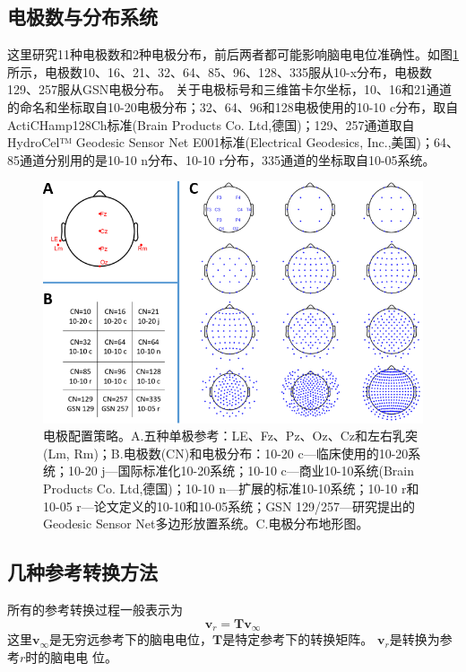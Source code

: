\subsection{电极数与分布系统}
这里研究11种电极数和2种电极分布，前后两者都可能影响脑电电位准确性。如图\ref{2:layout}所示，电极数10、16、21、32、64、85、96、128、335服从10-x分布，电极数129、257服从GSN电极分布。
关于电极标号和三维笛卡尔坐标，10、16和21通道的命名和坐标取自10-20电极分布；32、64、96和128电极使用的10-10 c分布，取自ActiCHamp128Ch标准(Brain Products Co. Ltd,德国)；129、257通道取自HydroCel™ Geodesic Sensor Net E001标准(Electrical Geodesics, Inc.,美国)；64、85通道分别用的是10-10 n分布、10-10 r分布，335通道的坐标取自10-05系统。
\bigskip
\bigskip
\bigskip
\bigskip
\begin{figure}[!ht]
	\centering
	\includegraphics[width=15cm]{pic/JNE/figure2.png}
	\caption{电极配置策略。A.五种单极参考：LE、Fz、Pz、Oz、Cz和左右乳突(Lm, Rm)；B.电极数(CN)和电极分布：10-20 c—临床使用的10-20系统；10-20 j—国际标准化10-20系统；10-10 c—商业10-10系统(Brain Products Co. Ltd,德国)；10-10 n—扩展的标准10-10系统；10-10 r和10-05 r—论文定义的10-10和10-05系统；GSN 129/257—研究提出的Geodesic Sensor Net多边形放置系统。C.电极分布地形图。}
	\label{2:layout}
\end{figure}
\subsection{几种参考转换方法}
所有的参考转换过程一般表示为
\begin{equation}\label{eq2.3}
\mathbf{v}_r=\mathbf{Tv}_{\infty}
\end{equation}
这里$\mathbf{v}_{\infty}$是无穷远参考下的脑电电位，$\mathbf{T}$是特定参考下的转换矩阵。 $\mathbf{v}_r$是转换为参考$r$时的脑电电
位。
